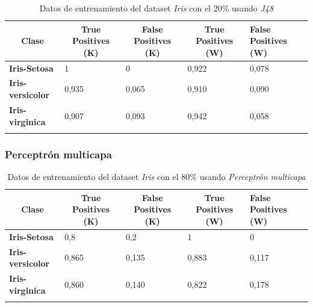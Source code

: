 \documentclass[10pt,a4paper]{article}
\begin{document}
\begin{table}[h!]
	\begin{tabular}{lllll}
		\hline
		\multicolumn{1}{|c|}{\textbf{Clase}} & \multicolumn{1}{c|}{\textbf{True Positives (K)}} & \multicolumn{1}{c|}{\textbf{False Positives (K)}} & \multicolumn{1}{c|}{\textbf{True Positives (W)}} & \multicolumn{1}{l|}{\textbf{False Positives (W)}} \\ \hline
		\multicolumn{1}{|l|}{\textbf{Iris-Setosa}} & \multicolumn{1}{l|}{1}          & \multicolumn{1}{l|}{0}          & \multicolumn{1}{l|}{0,922}          & \multicolumn{1}{l|}{0,078} \\ \hline
		\multicolumn{1}{|l|}{\textbf{Iris-versicolor}} & \multicolumn{1}{l|}{0,935}          & \multicolumn{1}{l|}{0,065}          & \multicolumn{1}{l|}{0,910}          & \multicolumn{1}{l|}{0,090} \\ \hline
		\multicolumn{1}{|l|}{\textbf{Iris-virginica}} & \multicolumn{1}{l|}{0,907}          & \multicolumn{1}{l|}{0,093}          & \multicolumn{1}{l|}{0,942}          & \multicolumn{1}{l|}{0,058}\\ \hline
		\textbf{}                       &                                &                                &                                &                      
		
	\end{tabular}
	\caption{Datos de entrenamiento del dataset \emph{Iris} con el 20\% usando \emph{J48}}
	\label{tab:iris_j48_20}
\end{table}
\subsubsection{Perceptrón multicapa}
\begin{table}[h!]
	\begin{tabular}{lllll}
		\hline
		\multicolumn{1}{|c|}{\textbf{Clase}} & \multicolumn{1}{c|}{\textbf{True Positives (K)}} & \multicolumn{1}{c|}{\textbf{False Positives (K)}} & \multicolumn{1}{c|}{\textbf{True Positives (W)}} & \multicolumn{1}{l|}{\textbf{False Positives (W)}} \\ \hline
		\multicolumn{1}{|l|}{\textbf{Iris-Setosa}} & \multicolumn{1}{l|}{0,8}          & \multicolumn{1}{l|}{0,2}          & \multicolumn{1}{l|}{1}          & \multicolumn{1}{l|}{0} \\ \hline
		\multicolumn{1}{|l|}{\textbf{Iris-versicolor}} & \multicolumn{1}{l|}{0,865}          & \multicolumn{1}{l|}{0,135}          & \multicolumn{1}{l|}{0,883}          & \multicolumn{1}{l|}{0,117} \\ \hline
		\multicolumn{1}{|l|}{\textbf{Iris-virginica}} & \multicolumn{1}{l|}{0,860}          & \multicolumn{1}{l|}{0,140}          & \multicolumn{1}{l|}{0,822}          & \multicolumn{1}{l|}{0,178}\\ \hline
		\textbf{}                       &                                &                                &                                &                      
		
	\end{tabular}
	\caption{Datos de entrenamiento del dataset \emph{Iris} con el 80\% usando \emph{Perceptrón multicapa}}
	\label{tab:iris_percep_80}
\end{table}
\end{document}
